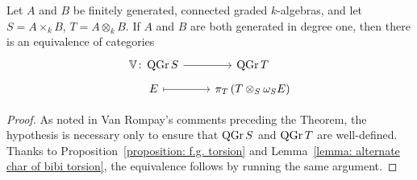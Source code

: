 \begin{theorem}[{\cite[Theorem 2.4]{VR96}}]\label{theorem: Van Rompay}
    Let \(A\) and \(B\) be finitely generated, connected graded \(k\)-algebras, and let \(S = A \times_k B\), \(T = A \otimes_k B\).
    If \(A\) and \(B\) are both generated in degree one, then there is an equivalence of categories
    \[\begin{tikzcd}[row sep=tiny]
    \mathbb{V} \colon \QGr{S} \arrow{r} & \QGr{T}\\
    E \arrow[mapsto]{r} & \pi_{T}\left(T \otimes_S \omega_{S}E\right)
    \end{tikzcd}\]
\end{theorem}

\begin{proof}
  As noted in Van Rompay's comments preceding the Theorem, the hypothesis is necessary only to ensure that \(\operatorname{QGr}S\) and \(\operatorname{QGr}T\) are well-defined.
  Thanks to Proposition~\ref{proposition: f.g. torsion} and Lemma~\ref{lemma: alternate char of bibi torsion}, the equivalence follows by running the same argument.
\end{proof}
